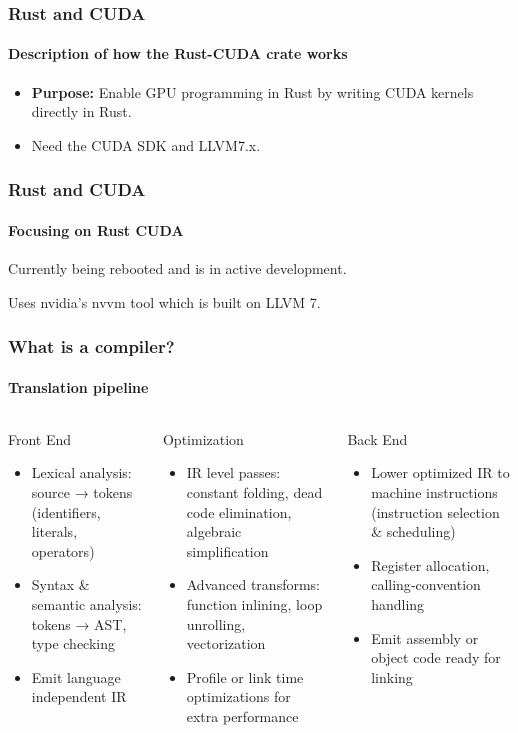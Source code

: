 \documentclass[aspectratio=169]{beamer}
\begin{document}
\begin{frame}
	\frametitle{Rust and CUDA}
	\framesubtitle{Description of how the Rust-CUDA crate works}

	\begin{itemize}
		\item \textbf{Purpose:} Enable GPU programming in Rust by writing CUDA kernels directly in Rust.
		\item Need the CUDA SDK and LLVM7.x.
	\end{itemize}
\end{frame}

\begin{frame}
	\frametitle{Rust and CUDA}
	\framesubtitle{Focusing on Rust CUDA}

	Currently being rebooted and is in active development.

	Uses nvidia's nvvm tool which is built on LLVM 7.
\end{frame}

\begin{frame}
	\frametitle{What is a compiler?}
	\framesubtitle{Translation pipeline}

    \begin{columns}[T]
        \begin{column}{0.3\textwidth}
            Front End
            \begin{itemize}
                \item Lexical analysis: source → tokens (identifiers, literals, operators)
                \item Syntax \& semantic analysis: tokens → AST, type checking
                \item Emit language independent IR
            \end{itemize}
        \end{column}
        \begin{column}{0.4\textwidth}
            Optimization
            \begin{itemize}
                \item IR level passes: constant folding, dead code elimination, algebraic simplification
                \item Advanced transforms: function inlining, loop unrolling, vectorization
                \item Profile  or link time optimizations for extra performance
            \end{itemize}
        \end{column}
        \begin{column}{0.3\textwidth}
Back End
            \begin{itemize}
                \item Lower optimized IR to machine instructions (instruction selection \& scheduling)
                \item Register allocation, calling‐convention handling
                \item Emit assembly or object code ready for linking
            \end{itemize}
        \end{column}
    \end{columns}
\end{frame}
\end{document}
